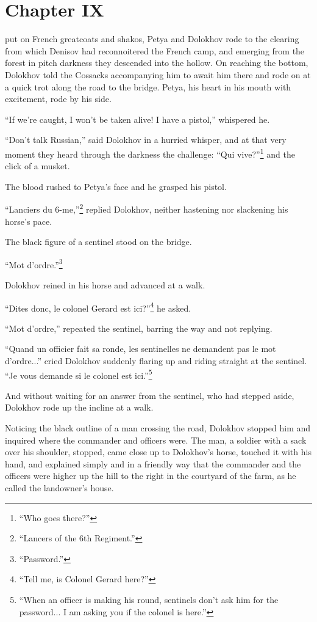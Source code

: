 \chapter*{Chapter IX} \ifaudio {}
\fi

 put on French greatcoats and shakos, Petya and Dolokhov
rode to the clearing from which Denisov had reconnoitered the
French camp, and emerging from the forest in pitch darkness they
descended into the hollow. On reaching the bottom, Dolokhov told
the Cossacks accompanying him to await him there and rode on at a
quick trot along the road to the bridge. Petya, his heart in his
mouth with excitement, rode by his side.

``If we're caught, I won't be taken alive! I have a pistol,''
whispered he.

``Don't talk Russian,'' said Dolokhov in a hurried whisper, and
at that very moment they heard through the darkness the
challenge: ``Qui vive?''\footnote{``Who goes there?''} and the
click of a musket.

The blood rushed to Petya's face and he grasped his pistol.

``Lanciers du 6-me,''\footnote{``Lancers of the 6th Regiment.''}
replied Dolokhov, neither hastening nor slackening his horse's
pace.

The black figure of a sentinel stood on the bridge.

``Mot d'ordre.''\footnote{``Password.''}

Dolokhov reined in his horse and advanced at a walk.

``Dites donc, le colonel Gerard est ici?''\footnote{``Tell me, is
  Colonel Gerard here?''} he asked.

``Mot d'ordre,'' repeated the sentinel, barring the way and not
replying.

``Quand un officier fait sa ronde, les sentinelles ne demandent
pas le mot d'ordre...'' cried Dolokhov suddenly flaring up and
riding straight at the sentinel. ``Je vous demande si le colonel
est ici.''\footnote{``When an officer is making his round,
sentinels don't ask him for the password... I am asking you if
the colonel is here.''}

And without waiting for an answer from the sentinel, who had
stepped aside, Dolokhov rode up the incline at a walk.

Noticing the black outline of a man crossing the road, Dolokhov
stopped him and inquired where the commander and officers
were. The man, a soldier with a sack over his shoulder, stopped,
came close up to Dolokhov's horse, touched it with his hand, and
explained simply and in a friendly way that the commander and the
officers were higher up the hill to the right in the courtyard of
the farm, as he called the landowner's house.

